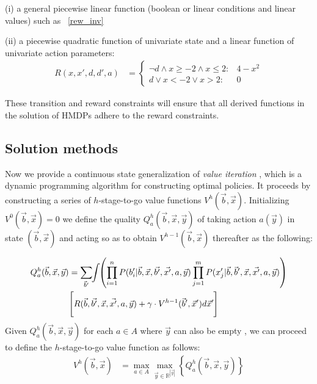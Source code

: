 \documentclass[twoside,11pt]{article}
\begin{document}
(i) a general piecewise linear function (boolean or linear conditions and linear values) such as ~\eqref{rew_inv}  

(ii) a piecewise quadratic function of univariate state and a linear function of univariate action parameters:
\begin{align}
R(x,x',d,d', a) & = \begin{cases}
\neg d \land x \geq -2 \land x \leq 2 : & 4 - x^2 \\
d \lor x < -2 \lor x > 2 : & 0
\end{cases} \label{rew:nonlinear}
\end{align}

These transition and reward constraints will ensure that all derived functions in the solution of HMDPs adhere to the reward 
constraints.

\subsection{Solution methods}
\label{sec:soln}
Now we provide a continuous state generalization of {\it value
iteration} \cite{bellman}, which is a dynamic programming algorithm
for constructing optimal policies.  It proceeds by constructing a
series of $h$-stage-to-go value functions $V^h(\vec{b},\vec{x})$.
Initializing $V^0(\vec{b},\vec{x}) = 0$ we define the quality
$Q_a^{h}(\vec{b},\vec{x},\vec{y})$ of taking action $a(\vec{y})$ in state
$(\vec{b},\vec{x})$ and acting so as to obtain
$V^{h-1}(\vec{b},\vec{x})$ thereafter as the following:

\vspace{-4mm}
{%
\begin{align}
Q_a^{h}(\vec{b},\vec{x},\vec{y}) & = 
 \sum_{\vec{b}'} \hspace{-1.0mm} \int \hspace{-1.0mm} \left( \prod_{i=1}^n P(b_i'|\vec{b},\vec{x},\vec{b'},\vec{x'},a,\vec{y}) \prod_{j=1}^m P(x_j'|\vec{b},\vec{b}',\vec{x},\vec{x'},a,\vec{y}) \right) \label{eq:qfun} \\ 
& \Bigg[ R(\vec{b},\vec{b'},\vec{x},\vec{x'}, a,\vec{y}) + \gamma \cdot V^{h-1}(\vec{b}',\vec{x}') d\vec{x}'  \hspace{-0.2mm} \Bigg] \nonumber
\end{align}}
Given $Q_a^h(\vec{b},\vec{x},\vec{y})$ for each $a \in A$ where $\vec{y}$ can also be empty , we can proceed
to define the $h$-stage-to-go value function as follows:
\begin{align}
V^{h}(\vec{b},\vec{x}) & = \max_{a \in A} \max_{\vec{y} \in \mathbb{R}^{|\vec{y}|}} \left\{ Q^{h}_a(\vec{b},\vec{x},\vec{y}) \right\} \label{eq:vfun}
\end{align}
\end{document}
